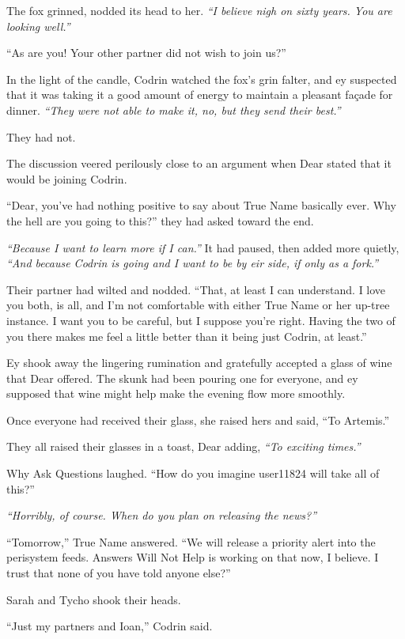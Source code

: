 The fox grinned, nodded its head to her. \emph{``I believe nigh on sixty years. You are looking well.''}

``As are you! Your other partner did not wish to join us?''

In the light of the candle, Codrin watched the fox's grin falter, and ey suspected that it was taking it a good amount of energy to maintain a pleasant façade for dinner. \emph{``They were not able to make it, no, but they send their best.''}

They had not.

The discussion veered perilously close to an argument when Dear stated that it would be joining Codrin.

``Dear, you've had nothing positive to say about True Name basically ever. Why the hell are you going to this?'' they had asked toward the end.

\emph{``Because I want to learn more if I can.''} It had paused, then added more quietly, \emph{``And because Codrin is going and I want to be by eir side, if only as a fork.''}

Their partner had wilted and nodded. ``That, at least I can understand. I love you both, is all, and I'm not comfortable with either True Name or her up-tree instance. I want you to be careful, but I suppose you're right. Having the two of you there makes me feel a little better than it being just Codrin, at least.''

Ey shook away the lingering rumination and gratefully accepted a glass of wine that Dear offered. The skunk had been pouring one for everyone, and ey supposed that wine might help make the evening flow more smoothly.

Once everyone had received their glass, she raised hers and said, ``To Artemis.''

They all raised their glasses in a toast, Dear adding, \emph{``To exciting times.''}

Why Ask Questions laughed. ``How do you imagine user11824 will take all of this?''

\emph{``Horribly, of course. When do you plan on releasing the news?''}

``Tomorrow,'' True Name answered. ``We will release a priority alert into the perisystem feeds. Answers Will Not Help is working on that now, I believe. I trust that none of you have told anyone else?''

Sarah and Tycho shook their heads.

``Just my partners and Ioan,'' Codrin said.

